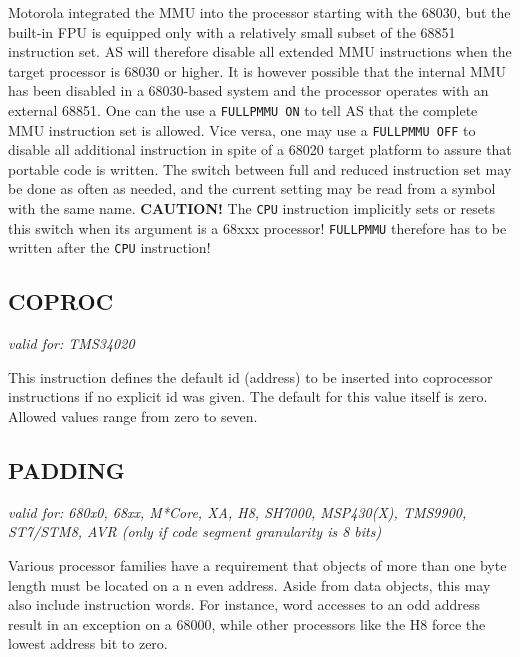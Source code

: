 \documentclass[12pt,twoside]{report}
\makeatletter
\newcommand{\bb}[1]{{\bf #1}}
\newcommand{\tty}[1]{{\tt #1}}
\newcommand{\ttindex}[1]{\index{#1@{\tt #1}}}
\newcommand{\asname}{{AS}}
\makeatother
\begin{document}
Motorola integrated the MMU into the processor starting with the 68030, but
the built-in FPU is equipped only with a relatively small subset of the
68851 instruction set.  \asname{} will therefore disable all extended MMU
instructions when the target processor is 68030 or higher.  It is however
possible that the internal MMU has been disabled in a 68030-based system
and the processor operates with an external 68851.  One can the use a
\tty{FULLPMMU ON} to tell \asname{} that the complete MMU instruction set is
allowed.  Vice versa, one may use a \tty{FULLPMMU OFF} to disable all
additional instruction in spite of a 68020 target platform to assure that
portable code is written.  The switch between full and reduced instruction
set may be done as often as needed, and the current setting may be read
from a symbol with the same name.  \bb{CAUTION!} The \tty{CPU} instruction
implicitly sets or resets this switch when its argument is a 68xxx
processor!  \tty{FULLPMMU} therefore has to be written after the \tty{CPU}
instruction!


\subsection{COPROC}
\ttindex{COPROC}

{\em valid for: TMS34020}

This instruction defines the default id (address) to be inserted into
coprocessor instructions if no explicit id was given.  The default for this
value itself is zero.  Allowed values range from zero to seven.


\subsection{PADDING}
\ttindex{PADDING}

{\em valid for: 680x0, 68xx, M*Core, XA, H8, SH7000, MSP430(X), TMS9900,\\
      ST7/STM8, AVR (only if code segment granularity is 8 bits)}

Various processor families have a requirement that objects of more than
one byte length must be located on a n even address.  Aside from data
objects, this may also include instruction words.  For instance, word
accesses to an odd address result in an exception on a 68000, while other
processors like the H8 force the lowest address bit to zero.
\end{document}

